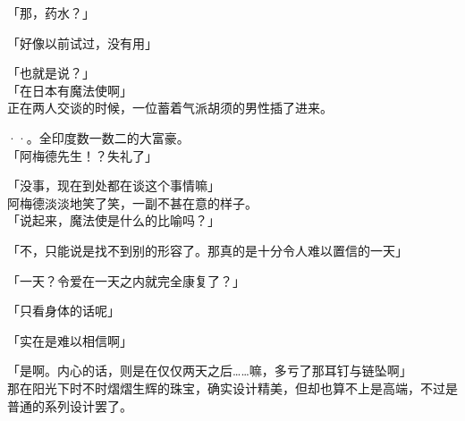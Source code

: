「那，药水？」

「好像以前试过，没有用」

「也就是说？」\\

「在日本有魔法使啊」\\

正在两人交谈的时候，一位蓄着气派胡须的男性插了进来。

··。全印度数一数二的大富豪。\\

「阿梅德先生！？失礼了」

「没事，现在到处都在谈这个事情嘛」\\

阿梅德淡淡地笑了笑，一副不甚在意的样子。\\

「说起来，魔法使是什么的比喻吗？」

「不，只能说是找不到别的形容了。那真的是十分令人难以置信的一天」

「一天？令爱在一天之内就完全康复了？」

「只看身体的话呢」

「实在是难以相信啊」

「是啊。内心的话，则是在仅仅两天之后……嘛，多亏了那耳钉与链坠啊」\\

那在阳光下时不时熠熠生辉的珠宝，确实设计精美，但却也算不上是高端，不过是普通的系列设计罢了。\\

